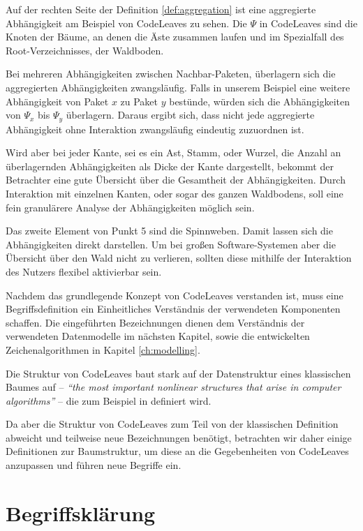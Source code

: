 Auf der rechten Seite der Definition \ref{def:aggregation} ist eine aggregierte Abhängigkeit am Beispiel von CodeLeaves zu sehen. Die $\Psi$ in CodeLeaves sind die Knoten der Bäume, an denen die Äste zusammen laufen und im Spezialfall des Root-Verzeichnisses, der Waldboden.

Bei mehreren Abhängigkeiten zwischen Nachbar-Paketen, überlagern sich die aggregierten Abhängigkeiten zwangsläufig. Falls in unserem Beispiel eine weitere Abhängigkeit von Paket $x$ zu Paket $y$ bestünde, würden sich die Abhängigkeiten von $\Psi_x$ bis $\Psi_y$ überlagern. Daraus ergibt sich, dass nicht jede aggregierte Abhängigkeit ohne Interaktion zwangsläufig eindeutig zuzuordnen ist.

Wird aber bei jeder Kante, sei es ein Ast, Stamm, oder Wurzel, die Anzahl an überlagernden Abhängigkeiten als Dicke der Kante dargestellt, bekommt der Betrachter eine gute Übersicht über die Gesamtheit der Abhängigkeiten. Durch Interaktion mit einzelnen Kanten, oder sogar des ganzen Waldbodens, soll eine fein granulärere Analyse der Abhängigkeiten möglich sein.

Das zweite Element von Punkt 5 sind die Spinnweben. Damit lassen sich die Abhängigkeiten direkt darstellen. Um bei großen Software-Systemen aber die Übersicht über den Wald nicht zu verlieren, sollten diese mithilfe der Interaktion des Nutzers flexibel aktivierbar sein.

Nachdem das grundlegende Konzept von CodeLeaves verstanden ist, muss eine Begriffsdefinition ein Einheitliches Verständnis der verwendeten Komponenten schaffen. Die eingeführten Bezeichnungen dienen dem Verständnis der verwendeten Datenmodelle im nächsten Kapitel, sowie die entwickelten Zeichenalgorithmen in Kapitel \ref{ch:modelling}.

Die Struktur von CodeLeaves baut stark auf der Datenstruktur eines klassischen Baumes auf -- \textit{"`the most important nonlinear structures that arise in computer algorithms"'}\cite{knuth1973fundamental} -- die zum Beispiel in \cite{knuth1973fundamental, ernst2016grundkurs, gumm2009einfuehrung} definiert wird.

Da aber die Struktur von CodeLeaves zum Teil von der klassischen Definition abweicht und teilweise neue Bezeichnungen benötigt, betrachten wir daher einige Definitionen zur Baumstruktur, um diese an die Gegebenheiten von CodeLeaves anzupassen und führen neue Begriffe ein.

\section{Begriffsklärung}
\label{sec:naming}

